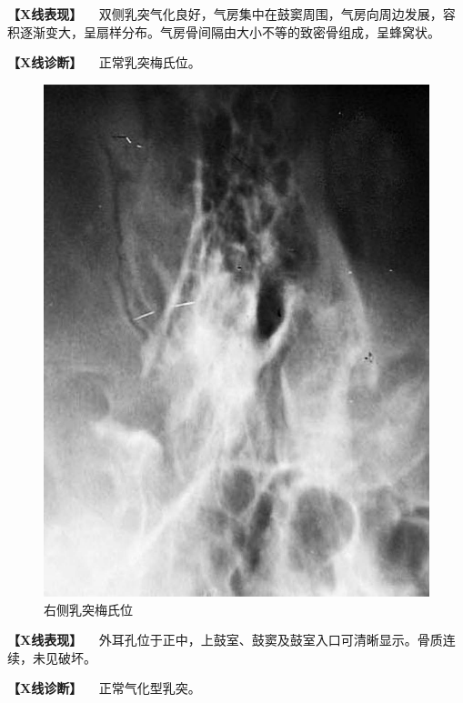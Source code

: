 \textbf{【X线表现】}
　双侧乳突气化良好，气房集中在鼓窦周围，气房向周边发展，容积逐渐变大，呈扇样分布。气房骨间隔由大小不等的致密骨组成，呈蜂窝状。

\textbf{【X线诊断】} 　正常乳突梅氏位。

\begin{figure}[!htbp]
 \centering
 \includegraphics{./images/Image00413.jpg}
 \captionsetup{justification=centering}
 \caption{右侧乳突梅氏位}
 \label{fig7-1-3}
  \end{figure} 

\textbf{【X线表现】}
　外耳孔位于正中，上鼓室、鼓窦及鼓室入口可清晰显示。骨质连续，未见破坏。

\textbf{【X线诊断】} 　正常气化型乳突。

